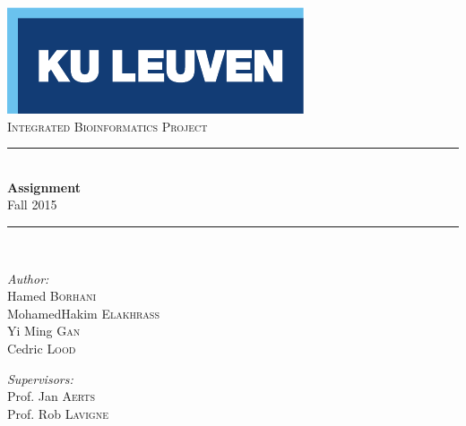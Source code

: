 \begin{titlepage}
  \begin{center}
    
    \includegraphics[scale=1.5]{Figures/kuleuven_logo.pdf}~\\[4.5cm]
    
    \textsc{\Large Integrated Bioinformatics Project}\\[0.5cm]
    
    \rule{\linewidth}{0.3mm}\\[0.4cm]
    {\huge \bfseries Assignment} \\[0.4cm]
    {\large Fall 2015} \\[0.4cm]
    \rule{\linewidth}{0.3mm}\\[1.5cm]
    
    \begin{minipage}{0.4\textwidth}
      \begin{flushleft} \large
        \emph{Author:}\\
        Hamed \textsc{Borhani}\\
		MohamedHakim \textsc{Elakhrass}\\
		Yi Ming \textsc{Gan}\\
		Cedric \textsc{Lood}
      \end{flushleft}
    \end{minipage}
    \begin{minipage}{0.4\textwidth}
      \begin{flushright} \large
        \emph{Supervisors:} \\
        Prof. Jan \textsc{Aerts}\\
        Prof. Rob \textsc{Lavigne}
      \end{flushright}
    \end{minipage}
    
    \vfill
    

\end{center}
\end{titlepage}

